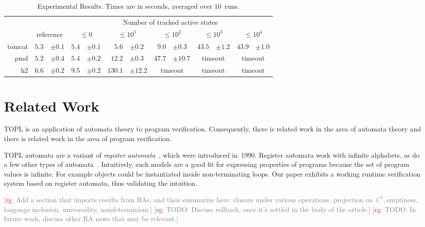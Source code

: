 \documentclass[9pt, preprint]{sigplanconf} %
\newcommand{\noterg}[2]{\textcolor{gray}{[\textcolor{red}{#1}: #2]}}
\newcommand{\rg}[1]{\noterg{rg}{#1}}
\theoremstyle{definition}
\theoremstyle{remark}
\begin{document}
\begin{table*}[t]\centering
\begin{tabular}{@{}rr@{}lr@{}lr@{}lr@{}lr@{}lr@{}l}
  &&
  & \multicolumn{10}{c}{Number of tracked active states} \\ \cmidrule{4-13}
& \multicolumn{2}{c}{reference}
  &\multicolumn{2}{c}{$\le0$}
  &\multicolumn{2}{c}{$\le10^1$}
  &\multicolumn{2}{c}{$\le10^2$}
  &\multicolumn{2}{c}{$\le10^3$}
  &\multicolumn{2}{c}{$\le10^4$} \\ \midrule
tomcat
  & $5.3$ & $\pm0.1$
  & $5.4$ & $\pm0.1$
  & $5.6$ & $\pm0.2$
  & $9.0$ & $\pm0.3$
  & $43.5$ & $\pm1.2$
  & $43.9$ & $\pm1.0$ \\
pmd
  & $5.2$ & $\pm0.4$
  & $5.4$ & $\pm0.2$
  & $12.2$ & $\pm0.3$
  & $47.7$ & $\pm10.7$
  & \multicolumn{2}{c}{timeout}
  & \multicolumn{2}{c}{timeout}
  \\
h2
  & $6.6$ & $\pm0.2$
  & $9.5$ & $\pm0.2$
  & $130.1$ & $\pm12.2$
  & \multicolumn{2}{c}{timeout}
  & \multicolumn{2}{c}{timeout}
  & \multicolumn{2}{c}{timeout}
  \\
\end{tabular}
\caption{
  Experimental Results.
  Times are in seconds, averaged over $10$~runs.
}\label{table:overhead}
\end{table*}

\section{Related Work}\label{sec:related} %

TOPL is an application of automata theory to program verification.
Consequently, there is related work in the area of automata theory and there is related work in the area of program verification.

TOPL automata are a variant of {\it register automata\/}~\cite{dblp:conf/focs/kaminskif90}, which were introduced in~1990.
Register automata work with infinite alphabets, as do a few other types of automata~\cite{dblp:conf/csl/segoufin06}.
Intuitively, such models are a good fit for expressing properties of programs because the set of program values is infinite.
For example objects could be instantiated inside non-terminating loops.
Our paper exhibits a working runtime verification system based on register automata, thus validating the intuition.

\rg{Add a section that imports results from RAs, and then summarize here:
closure under various operations, projection on~$C^*, $emptiness, language inclusion, universality, nondeterminism.}
\rg{TODO: Discuss rollback, once it's settled in the body of the article.}
\rg{TODO: In future work, discuss other RA news that may be relevant.}
\end{document}
